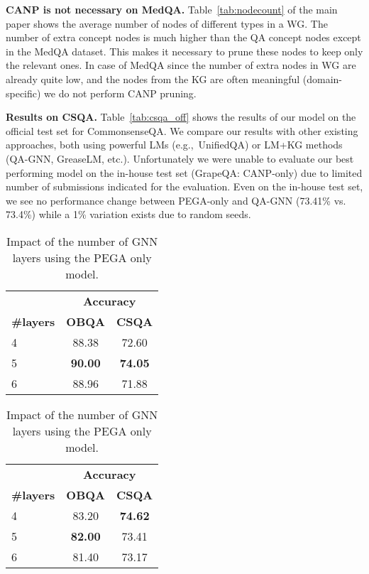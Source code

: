\documentclass[11pt]{article}
\renewcommand{\paragraph}[1]{\vspace{1mm}\noindent\textbf{#1}}
\begin{document}
\paragraph{CANP is not necessary on MedQA.}
Table~\ref{tab:nodecount} of the main paper shows the average number of nodes of different types in a WG.
The number of extra concept nodes is much higher than the QA concept nodes except in the MedQA dataset.
This makes it necessary to prune these nodes to keep only the relevant ones.
In case of MedQA since the number of extra nodes in WG are already quite low, and the nodes from the KG are often meaningful (domain-specific) we do not perform CANP pruning.

\paragraph{Results on CSQA.}
Table~\ref{tab:csqa_off} shows the results of our model on the official test set for CommonsenseQA.
We compare our results with other existing approaches, both using powerful LMs (e.g.,~UnifiedQA) or LM+KG methods (QA-GNN, GreaseLM, etc.).
Unfortunately we were unable to evaluate our best performing model on the in-house test set (GrapeQA: CANP-only) due to limited number of submissions indicated for the evaluation.
Even on the in-house test set, we see no performance change between PEGA-only and QA-GNN (73.41\% vs. 73.4\%) while a 1\% variation exists due to random seeds.


\begin{table}[h]
\caption{Impact of the number of GNN layers using the PEGA+CANP model.}
\centering
\tabcolsep=0.10cm
\begin{tabular}{lcc}
\toprule
 & \multicolumn{2}{c}{ \textbf{Accuracy} } \\
\textbf{\#layers} & \textbf{OBQA} & \textbf{CSQA} \\
\midrule
4 & 88.38 &  72.60\\ 
5 & \bf 90.00 &  \bf 74.05\\
6 & 88.96 & 71.88\\
\bottomrule

\end{tabular}

\label{tab:num_layers_pc}
\vspace{5mm}
\caption{Impact of the number of GNN layers using the PEGA only model.}
\centering
\begin{tabular}{lcc}

\toprule
 & \multicolumn{2}{c}{ \textbf{Accuracy} } \\
\textbf{\#layers} & \textbf{OBQA} & \textbf{CSQA} \\
\midrule
4 & 83.20 & \bf 74.62\\ 
5 & \bf 82.00 &  73.41\\
6 & 81.40 & 73.17\\
\bottomrule
\end{tabular}

\label{tab:num_layers_p}
\end{table}
\end{document}
